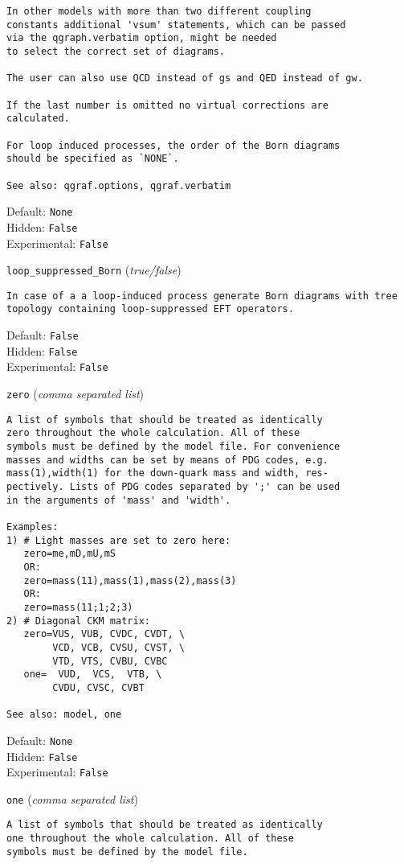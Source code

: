 \begin{basedescript}{\desclabelstyle{\pushlabel}}
\begin{verbatim}
In other models with more than two different coupling
constants additional 'vsum' statements, which can be passed
via the qgraph.verbatim option, might be needed
to select the correct set of diagrams.

The user can also use QCD instead of gs and QED instead of gw.

If the last number is omitted no virtual corrections are
calculated.

For loop induced processes, the order of the Born diagrams
should be specified as `NONE`.

See also: qgraf.options, qgraf.verbatim
\end{verbatim}
Default: \verb|None|
\\Hidden: \verb|False|
\\Experimental: \verb|False|
\\\item[\colorbox{gray!30}{\texttt{loop\_suppressed\_Born}}] (\textit{true/false})
\begin{verbatim}
In case of a a loop-induced process generate Born diagrams with tree
topology containing loop-suppressed EFT operators.
\end{verbatim}
Default: \verb|False|
\\Hidden: \verb|False|
\\Experimental: \verb|False|
\\\item[\colorbox{gray!30}{\texttt{zero}}] (\textit{comma separated list})
\begin{verbatim}
A list of symbols that should be treated as identically
zero throughout the whole calculation. All of these
symbols must be defined by the model file. For convenience
masses and widths can be set by means of PDG codes, e.g.
mass(1),width(1) for the down-quark mass and width, res-
pectively. Lists of PDG codes separated by ';' can be used
in the arguments of 'mass' and 'width'.

Examples:
1) # Light masses are set to zero here:
   zero=me,mD,mU,mS
   OR:
   zero=mass(11),mass(1),mass(2),mass(3)
   OR:
   zero=mass(11;1;2;3)
2) # Diagonal CKM matrix:
   zero=VUS, VUB, CVDC, CVDT, \
        VCD, VCB, CVSU, CVST, \
        VTD, VTS, CVBU, CVBC
   one=  VUD,  VCS,  VTB, \
        CVDU, CVSC, CVBT

See also: model, one
\end{verbatim}
Default: \verb|None|
\\Hidden: \verb|False|
\\Experimental: \verb|False|
\\\item[\colorbox{gray!30}{\texttt{one}}] (\textit{comma separated list})
\begin{verbatim}
A list of symbols that should be treated as identically
one throughout the whole calculation. All of these
symbols must be defined by the model file.


\end{verbatim}
\end{basedescript}
